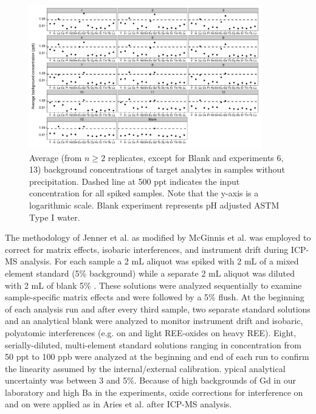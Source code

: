 \begin{figure}
\begin{center}
\includegraphics[width=0.9\textwidth]{Ch4_figures/REE-bkgd.pdf}
\caption{Average (from $n \geq 2$ replicates, except for Blank and experiments 6, 13) background concentrations of target analytes in samples without  precipitation.
Dashed line at 500 ppt indicates the input concentration for all spiked samples.
Note that the y-axis is a logarithmic scale. Blank experiment represents pH adjusted ASTM Type I water.}\label{fig:REE-bkgd}
\end{center}
\end{figure}

The methodology of Jenner et al. \citep{Jenner_CG_1990} as modified by McGinnis et al. \citep{McGinnis_GN_1997} was employed to correct for matrix effects, isobaric interferences, and instrument drift during ICP-MS analysis.
For each sample a 2 mL aliquot was spiked with 2 mL of a mixed element standard (5\%  background) while a separate 2 mL aliquot was diluted with 2 mL of blank 5\% .
These solutions were analyzed sequentially to examine sample-specific matrix effects and were followed by a 5\%  flush.
At the beginning of each analysis run and after every third sample, two separate standard solutions and an analytical blank were analyzed to monitor instrument drift and isobaric, polyatomic interferences (e.g.  on  and light REE-oxides on heavy REE).
Eight, serially-diluted, multi-element standard solutions ranging in concentration from 50 ppt to 100 ppb were analyzed at the beginning and end of each run to confirm the linearity assumed by the internal/external calibration.
ypical analytical uncertainty was between 3 and 5\%.
Because of high backgrounds of Gd in our laboratory and high Ba in the experiments, oxide corrections for  interference on  and  on  were applied as in Aries et al. \citep{Aries_GN_2000} after ICP-MS analysis.

